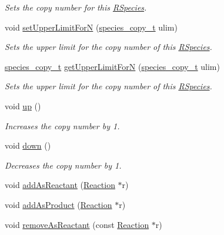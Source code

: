 \begin{DoxyCompactItemize}
\begin{DoxyCompactList}\small\item\em Sets the copy number for this \hyperlink{classchem_1_1RSpecies}{R\-Species}. \end{DoxyCompactList}\item 
void \hyperlink{classchem_1_1RSpecies_a13c47ccb546b64f83ac09734c286fcd2}{set\-Upper\-Limit\-For\-N} (\hyperlink{common_8h_a3503f321fd36304ee274141275cca586}{species\-\_\-copy\-\_\-t} ulim)
\begin{DoxyCompactList}\small\item\em Sets the upper limit for the copy number of this \hyperlink{classchem_1_1RSpecies}{R\-Species}. \end{DoxyCompactList}\item 
\hyperlink{common_8h_a3503f321fd36304ee274141275cca586}{species\-\_\-copy\-\_\-t} \hyperlink{classchem_1_1RSpecies_a32806fa7ef59b5043892e1ad328a569e}{get\-Upper\-Limit\-For\-N} (\hyperlink{common_8h_a3503f321fd36304ee274141275cca586}{species\-\_\-copy\-\_\-t} ulim)
\begin{DoxyCompactList}\small\item\em Sets the upper limit for the copy number of this \hyperlink{classchem_1_1RSpecies}{R\-Species}. \end{DoxyCompactList}\item 
void \hyperlink{classchem_1_1RSpecies_ae721e3c649a12e0a81bc6b77afe23f38}{up} ()
\begin{DoxyCompactList}\small\item\em Increases the copy number by 1. \end{DoxyCompactList}\item 
void \hyperlink{classchem_1_1RSpecies_a0b9db54a1407d689be7477e77b4bb1c6}{down} ()
\begin{DoxyCompactList}\small\item\em Decreases the copy number by 1. \end{DoxyCompactList}\item 
void \hyperlink{classchem_1_1RSpecies_a88c4e30858e503105a3fa39e649060ef}{add\-As\-Reactant} (\hyperlink{classchem_1_1Reaction}{Reaction} $\ast$r)
\item 
void \hyperlink{classchem_1_1RSpecies_ab81e66709c72efa36ee8f29f969dc477}{add\-As\-Product} (\hyperlink{classchem_1_1Reaction}{Reaction} $\ast$r)
\item 
void \hyperlink{classchem_1_1RSpecies_ad0a8e2da5b7a0362b1fb20ad72671005}{remove\-As\-Reactant} (const \hyperlink{classchem_1_1Reaction}{Reaction} $\ast$r)

\end{DoxyCompactItemize}
